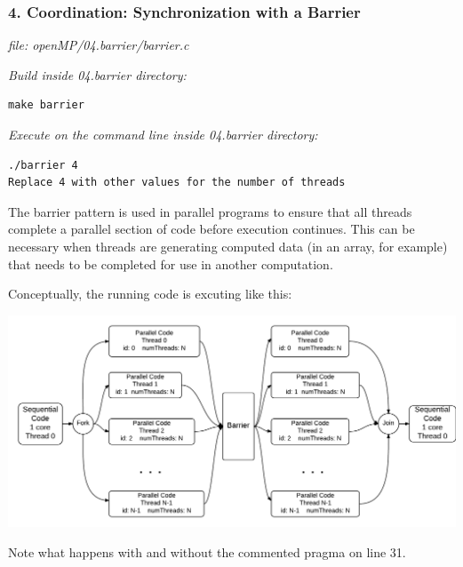 \documentclass[letterpaper,10pt,openany,oneside]{sphinxmanual}
\begin{document}
\subsubsection{4. Coordination: Synchronization with a Barrier}
\label{SharedMemory/ProgStructure_Barrier:coordination-synchronization-with-a-barrier}
\emph{file: openMP/04.barrier/barrier.c}

\emph{Build inside 04.barrier directory:}

\begin{Verbatim}[commandchars=\\\{\}]
make barrier
\end{Verbatim}

\emph{Execute on the command line inside 04.barrier directory:}

\begin{Verbatim}[commandchars=\\\{\}]
./barrier 4
Replace 4 with other values for the number of threads
\end{Verbatim}

The barrier pattern is used in parallel programs to ensure that all threads complete
a parallel section of code before execution continues. This can be necessary when
threads are generating computed data (in an array, for example) that needs to be
completed for use in another computation.

Conceptually, the running code is excuting like this:

\includegraphics{ForkJoin_Barrier.png}

Note what happens with and without the commented pragma on line 31.
\end{document}
